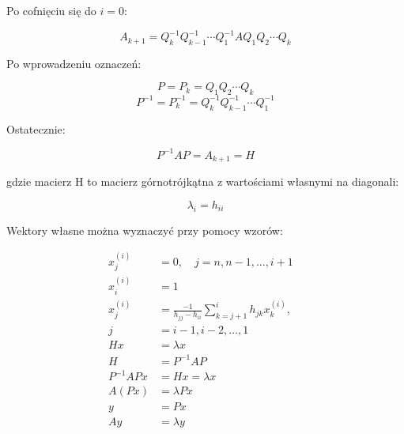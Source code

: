\documentclass{article}
\begin{document}
\noindent
Po cofnięciu się do $i=0$:

\begin{equation*}
A_{k+1} = Q_k^{-1} Q_{k-1}^{-1} \cdots Q_1^{-1} A Q_1 Q_2 \cdots Q_k
\end{equation*}

\noindent
Po wprowadzeniu oznaczeń:

\begin{equation*}
P = P_k = Q_1 Q_2 \cdots Q_k
\end{equation*}
\begin{equation*}
P^{-1} = P_k^{-1} = Q_k^{-1} Q_{k-1}^{-1} \cdots Q_1^{-1}
\end{equation*}

\noindent 
Ostatecznie:

\begin{equation*}
P^{-1} A P = A_{k+1} = H
\end{equation*}

\noindent
gdzie macierz H to macierz górnotrójkątna z wartościami własnymi na diagonali:

\begin{equation*}
\lambda_i = h_{ii}
\end{equation*}

\noindent
Wektory własne można wyznaczyć przy pomocy wzorów:

\begin{align*}
x_j^{(i)} &= 0, \quad j = n, n - 1, \ldots, i + 1 \\
x_i^{(i)} &= 1 \\
x_j^{(i)} &= \frac{-1}{h_{jj} - h_{ii}} \sum_{k=j+1}^{i} h_{jk}  x_k^{(i)}, \quad \\
j &= i - 1, i - 2, \ldots, 1 \\
Hx &= \lambda x \\
H &= P^{-1}AP \\
P^{-1}APx &= Hx = \lambda x \\
A(Px) &= \lambda Px \\
y &= Px \\
Ay &= \lambda y
\end{align*}
\end{document}
